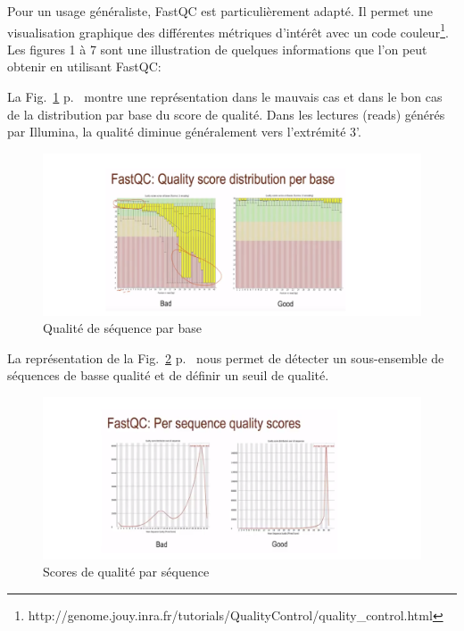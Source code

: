 \documentclass[a4paper,11pt]{article}
\begin{document}
Pour un usage généraliste, FastQC est particulièrement adapté. Il
permet une visualisation graphique des différentes métriques d'intérêt
avec un code
couleur\footnote{{http://genome.jouy.inra.fr/tutorials/QualityControl/quality_control.html}}. Les
figures 1 à 7 sont une illustration de quelques informations que l'on
peut obtenir en utilisant FastQC:

La Fig.~\ref{fig-Fastqc_Plots1} p.~\pageref{fig-Fastqc_Plots1} montre
une représentation dans le mauvais cas et dans le bon cas de la
distribution par base du score de qualité. Dans les lectures (reads)
générés par Illumina, la qualité diminue généralement vers l'extrémité
3'.

\begin{figure}
  \begin{center}
    \includegraphics[width=16cm]{Images/Fastqc_Plots1}
  \end{center}
  \caption{Qualité de séquence par base}
  \label{fig-Fastqc_Plots1}
\end{figure}

La représentation de la Fig.~\ref{fig-Fastqc_Plots2}
p.~\pageref{fig-Fastqc_Plots2} nous permet de détecter un
sous-ensemble de séquences de basse qualité et de définir un seuil de
qualité.

\begin{figure}
  \begin{center}
    \includegraphics[width=16cm]{Images/Fastqc_Plots2}
  \end{center}
  \caption{Scores de qualité par séquence}
  \label{fig-Fastqc_Plots2}
\end{figure}
\end{document}

